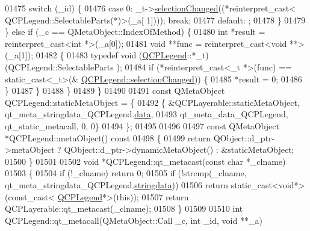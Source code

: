 \begin{DoxyCode}
01475         \textcolor{keywordflow}{switch} (\_id) \{
01476         \textcolor{keywordflow}{case} 0: \_t->\hyperlink{a00045_a286149b644d5f5c884a0140219d979f6}{selectionChanged}((*\textcolor{keyword}{reinterpret\_cast<} QCPLegend::SelectableParts(*)\textcolor{keyword}{>}(\_a[
      1]))); \textcolor{keywordflow}{break};
01477         \textcolor{keywordflow}{default}: ;
01478         \}
01479     \} \textcolor{keywordflow}{else} \textcolor{keywordflow}{if} (\_c == QMetaObject::IndexOfMethod) \{
01480         \textcolor{keywordtype}{int} *result = \textcolor{keyword}{reinterpret\_cast<}\textcolor{keywordtype}{int} *\textcolor{keyword}{>}(\_a[0]);
01481         \textcolor{keywordtype}{void} **func = \textcolor{keyword}{reinterpret\_cast<}\textcolor{keywordtype}{void} **\textcolor{keyword}{>}(\_a[1]);
01482         \{
01483             \textcolor{keyword}{typedef} void (\hyperlink{a00045}{QCPLegend}::*\_t)(QCPLegend::SelectableParts );
01484             \textcolor{keywordflow}{if} (*reinterpret\_cast<\_t *>(func) == \textcolor{keyword}{static\_cast<}\_t\textcolor{keyword}{>}(&
      \hyperlink{a00045_a286149b644d5f5c884a0140219d979f6}{QCPLegend::selectionChanged})) \{
01485                 *result = 0;
01486             \}
01487         \}
01488     \}
01489 \}
01490 
01491 \textcolor{keyword}{const} QMetaObject QCPLegend::staticMetaObject = \{
01492     \{ &QCPLayerable::staticMetaObject, qt\_meta\_stringdata\_QCPLegend.\hyperlink{a00067_abb2a7af4ffa957bddb891b5663c0aa55}{data},
01493       qt\_meta\_data\_QCPLegend,  qt\_static\_metacall, 0, 0\}
01494 \};
01495 
01496 
01497 \textcolor{keyword}{const} QMetaObject *QCPLegend::metaObject()\textcolor{keyword}{ const}
01498 \textcolor{keyword}{}\{
01499     \textcolor{keywordflow}{return} QObject::d\_ptr->metaObject ? QObject::d\_ptr->dynamicMetaObject() : &staticMetaObject;
01500 \}
01501 
01502 \textcolor{keywordtype}{void} *QCPLegend::qt\_metacast(\textcolor{keyword}{const} \textcolor{keywordtype}{char} *\_clname)
01503 \{
01504     \textcolor{keywordflow}{if} (!\_clname) \textcolor{keywordflow}{return} 0;
01505     \textcolor{keywordflow}{if} (!strcmp(\_clname, qt\_meta\_stringdata\_QCPLegend.\hyperlink{a00067_a26b79395b8d9f94641f81b197841ede1}{stringdata}))
01506         \textcolor{keywordflow}{return} \textcolor{keyword}{static\_cast<}\textcolor{keywordtype}{void}*\textcolor{keyword}{>}(\textcolor{keyword}{const\_cast<} \hyperlink{a00045}{QCPLegend}*\textcolor{keyword}{>}(\textcolor{keyword}{this}));
01507     \textcolor{keywordflow}{return} QCPLayerable::qt\_metacast(\_clname);
01508 \}
01509 
01510 \textcolor{keywordtype}{int} QCPLegend::qt\_metacall(QMetaObject::Call \_c, \textcolor{keywordtype}{int} \_id, \textcolor{keywordtype}{void} **\_a)

\end{DoxyCode}
